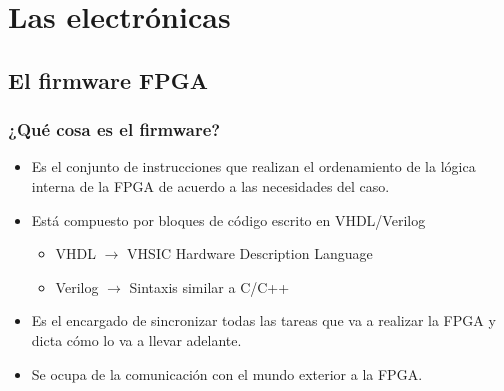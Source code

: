 \documentclass{beamer}
\begin{document}
\section{Las electrónicas}
\begin{frame}
  \begin{center}
    \Huge{\color{blue}{Las electrónicas: \\ El firmware de la FPGA}}
  \end{center}
\end{frame}

\subsection{El firmware FPGA}

\begin{frame}
  \frametitle{¿Qué cosa es el firmware?}
    \begin{block}{}
      \begin{itemize}
        \pause
        \item Es el conjunto de instrucciones que realizan el ordenamiento de la
              lógica interna de la FPGA de acuerdo a las necesidades del caso.
        \pause
        \item Está compuesto por bloques de código escrito en VHDL/Verilog
          \begin{itemize}
            \item VHDL $\rightarrow$ VHSIC Hardware Description Language
            \item Verilog $\rightarrow$ Sintaxis similar a C/C++
          \end{itemize}
        \pause
        \item Es el encargado de sincronizar todas las tareas que va a realizar
              la FPGA y dicta cómo lo va a llevar adelante.
        \pause
        \item Se ocupa de la comunicación con el mundo exterior a la FPGA.
      \end{itemize}
    \end{block}
\end{frame}
\end{document}
